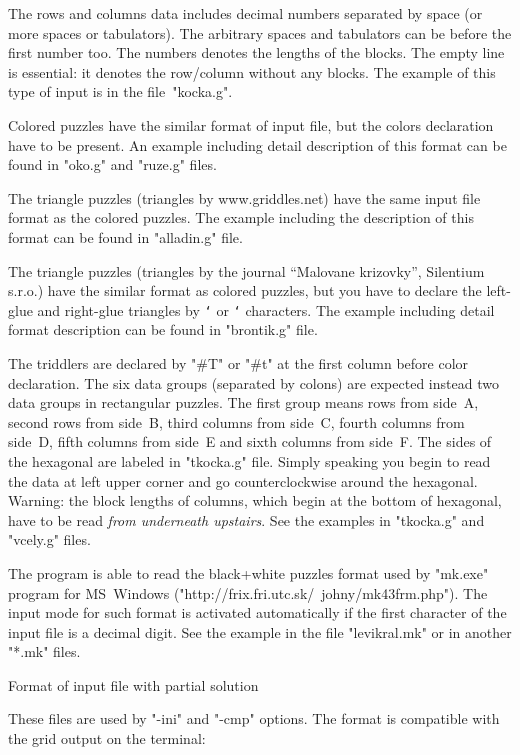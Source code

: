 The rows and columns data includes decimal numbers separated by
space (or more spaces or tabulators). The arbitrary spaces and
tabulators can be before the first number too.
The numbers denotes the lengths of the blocks.
The empty line is essential: it denotes the row/column without
any blocks. The example of this type of input is in the 
file~"kocka.g".

Colored puzzles have the similar format of input file, but the colors
declaration have to be present. An example including detail
description of this format can be found in "oko.g" and "ruze.g" files.

The triangle puzzles (triangles by www.griddles.net) have the same
input file format as the colored puzzles. The example including the 
description of this format can be found in "alladin.g" file.

The triangle puzzles (triangles by the journal ``Malovane krizovky'',
Silentium s.r.o.) have the similar format as colored puzzles, but
you have to declare the left-glue and right-glue triangles by
{\tt\char`\<} or {\tt\char`\>} characters. The example including
detail format description can be found in "brontik.g" file. 

The triddlers are declared by "#T" or "#t" at the first column
before color declaration. The six data groups (separated by
colons) are expected instead two data groups in rectangular puzzles.
The first group means rows from side~A, second rows from side~B,
third columns from side~C, fourth columns from side~D, fifth columns
from side~E and sixth columns from side~F. The sides of the hexagonal are 
labeled in "tkocka.g" file. Simply speaking you begin to read the data
at left upper corner and go counterclockwise around the hexagonal.
Warning: the block lengths of columns, which begin at the bottom of
hexagonal, have to be read {\it from underneath upstairs}.
See the examples in "tkocka.g" and "vcely.g" files.

The program is able to read the black+white puzzles format
used by "mk.exe" program for MS~Windows 
("http://frix.fri.utc.sk/~johny/mk43frm.php").
The input mode for such format is activated automatically if the
first character of the input file is a decimal digit.
See the example in the file "levikral.mk" or in another "*.mk" files.


\tit Format of input file with partial solution

These files are used by "-ini" and "-cmp" options.
The format is compatible with the grid output on the terminal:

